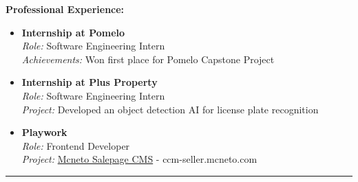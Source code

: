 \documentclass[a4paper,10pt]{article}
\begin{document}
\noindent
\textbf{Professional Experience:}
\begin{itemize}[leftmargin=0.5cm]
    \item \textbf{Internship at Pomelo} \\ \textit{Role:} Software Engineering Intern \\ \textit{Achievements:} Won first place for Pomelo Capstone Project

    \item \textbf{Internship at Plus Property} \\ \textit{Role:} Software Engineering Intern \\ \textit{Project:} Developed an object detection AI for license plate recognition
    \item \textbf{Playwork} \\ \textit{Role:} Frontend Developer \\ \textit{Project:} \href{https://ccm-seller.mcneto.com/}{Mcneto Salepage CMS} - ccm-seller.mcneto.com

\end{itemize}

\hrule
\vspace{0.3cm}
\end{document}
